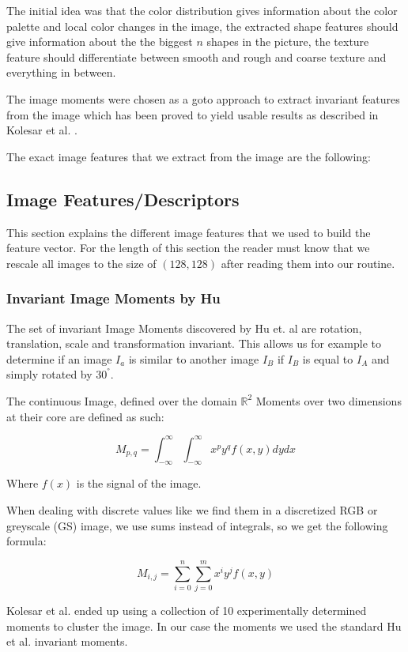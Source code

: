 \documentclass[journal]{vgtc}       %
\begin{document}
The initial idea was that the color distribution gives information about the color palette and local color changes in the image, the extracted shape features should give information about the the biggest \( n \) shapes in the picture, the texture feature should differentiate between smooth and rough and coarse texture and everything in between.

The image moments were chosen as a goto approach to extract invariant features from the image which has been proved to yield usable results as described in Kolesar et al. \cite{kolesar}.

The exact image features that we extract from the image are the following:
\subsection{Image Features/Descriptors}
This section explains the different image features that we used to build the feature vector.
For the length of this section the reader must know that we rescale all images to the size of $(128,128)$ after reading them into our routine.
\subsubsection{Invariant Image Moments by Hu}\label{subsec:humom}

The set of invariant Image Moments discovered by Hu et. al  are rotation, translation, scale and transformation  invariant. This allows us for example to determine if an image $I_a$ is similar to another image $I_B$ if $I_B$ is equal to $I_A$ and simply rotated by $30^{°}$.

The continuous  Image, defined over the domain \(\mathbb{R}^2\) Moments  over two dimensions at their core are defined as such:

\[M_{p,q} = \int^\infty_{- \infty}\int^\infty_{- \infty} x^py^q f(x,y) dy dx \]

Where \(f(x)\) is the signal of the image. 

When dealing with discrete values like we find them in a discretized RGB or greyscale (GS) image, we use sums instead of integrals, so we get the following formula:

\[M_{i,j} = \sum^n_{i=0}\sum^m_{j=0} x^i y^j f(x,y) \]

Kolesar et al. ended up using a collection of 10 experimentally determined moments to cluster the image. In our case the moments we used the standard Hu et al. invariant moments. 
\end{document}
